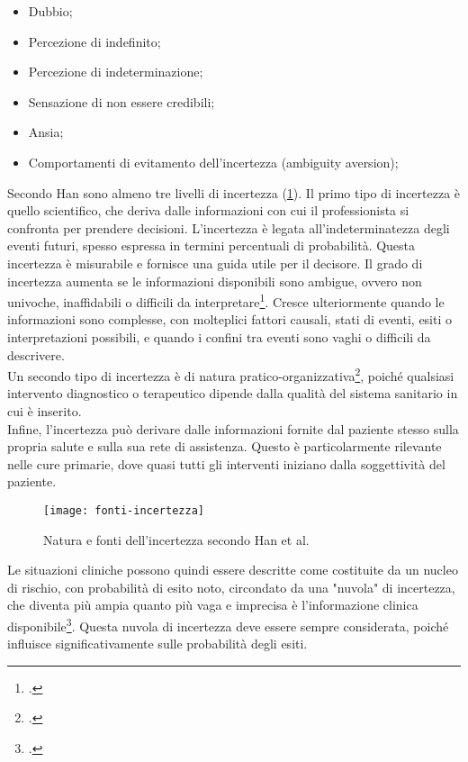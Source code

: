 \begin{itemize}
    \item Dubbio;
    \item Percezione di indefinito;
    \item Percezione di indeterminazione;
    \item Sensazione di non essere credibili;
    \item Ansia;
    \item Comportamenti di evitamento dell'incertezza (ambiguity aversion);
\end{itemize}

\noindent Secondo Han sono almeno tre livelli di incertezza (\ref{fig:fonti-incertezza}). Il primo tipo di incertezza è quello scientifico, che deriva dalle informazioni con cui il professionista si confronta per prendere decisioni. L'incertezza è legata all'indeterminatezza degli eventi futuri, spesso espressa in termini percentuali di probabilità. Questa incertezza è misurabile e fornisce una guida utile per il decisore. Il grado di incertezza aumenta se le informazioni disponibili sono ambigue, ovvero non univoche, inaffidabili o difficili da interpretare\footcite{womak:recenti-progressi-medicina}. Cresce ulteriormente quando le informazioni sono complesse, con molteplici fattori causali, stati di eventi, esiti o interpretazioni possibili, e quando i confini tra eventi sono vaghi o difficili da descrivere.\\
Un secondo tipo di incertezza è di natura pratico-organizzativa\footcite{womak:recenti-progressi-medicina}, poiché qualsiasi intervento diagnostico o terapeutico dipende dalla qualità del sistema sanitario in cui è inserito.\\
Infine, l'incertezza può derivare dalle informazioni fornite dal paziente stesso sulla propria salute e sulla sua rete di assistenza. Questo è particolarmente rilevante nelle cure primarie, dove quasi tutti gli interventi iniziano dalla soggettività del paziente.\\

\begin{figure}[!ht] 
    \centering 
    \texttt{[image: fonti-incertezza]} 
    \caption{Natura e fonti dell'incertezza secondo Han et al.}
    \label{fig:fonti-incertezza}
\end{figure}

Le situazioni cliniche possono quindi essere descritte come costituite da un nucleo di rischio, con probabilità di esito noto, circondato da una "nuvola" di incertezza, che diventa più ampia quanto più vaga e imprecisa è l'informazione clinica disponibile\footcite{womak:clinica-relazione-decisione}. Questa nuvola di incertezza deve essere sempre considerata, poiché influisce significativamente sulle probabilità degli esiti.


